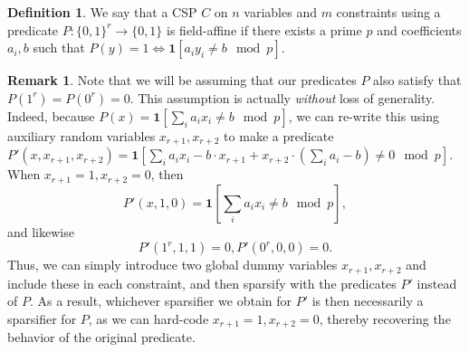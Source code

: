 \documentclass[11pt]{article}
\theoremstyle{definition}
\newtheorem{definition}{Definition}[section]
\newtheorem{remark}[theorem]{Remark}
\newcommand{\zo}{\{0, 1\}}
\begin{document}
\begin{definition}\label{def:fieldaffine}
    We say that a CSP $C$ on $n$ variables and $m$ constraints using a predicate $P: \zo^r \rightarrow \zo$ is field-affine if there exists a prime $p$ and coefficients $a_i, b$ such that $P(y) = 1 \iff \mathbf{1}[a_i y_i \neq b \mod p]$.
\end{definition}

\begin{remark}\label{rmk:zeroPredicate}
Note that we will be assuming that our predicates $P$ also satisfy that $P(1^r) = P(0^r) = 0$. This assumption is actually \emph{without} loss of generality. Indeed, because $P(x) = \mathbf{1}[\sum_i a_i x_i \neq b \mod p]$, we can re-write this using auxiliary random variables $x_{r+1}, x_{r+2}$ to make a predicate $P'(x, x_{r+1}, x_{r+2}) = \mathbf{1}[\sum_i a_i x_i - b \cdot x_{r+1} + x_{r+2} \cdot (\sum_i a_i - b) \neq 0 \mod p]$. When $x_{r+1} = 1, x_{r+2} = 0$, then 
\[
P'(x, 1, 0) = \mathbf{1}[\sum_i a_i x_i \neq b \mod p],
\]
and likewise
\[
P'(1^r, 1, 1) = 0, P'(0^r, 0, 0) = 0.
\]
Thus, we can simply introduce two global dummy variables $x_{r+1}, x_{r+2}$ and include these in each constraint, and then sparsify with the predicates $P'$ instead of $P$. As a result, whichever sparsifier we obtain for $P'$ is then necessarily a sparsifier for $P$, as we can hard-code $x_{r+1} = 1, x_{r+2} = 0$, thereby recovering the behavior of the original predicate. 
\end{remark}
\end{document}
